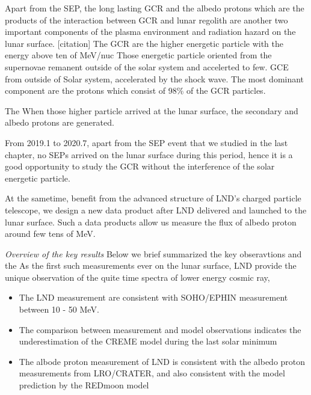 Apart from the \acs{SEP}, the long lasting \ac{GCR} and the albedo protons which are the products of the interaction between \ac{GCR} and lunar regolith are another two important components of the plasma environment and radiation hazard on the lunar surface. [citation]
The \ac{GCR} are the higher energetic particle with the energy above ten of MeV/nuc
Those energetic particle oriented from the supernovae remanent outside of the solar system and accelerted to few. GCE from outside of Solar system, accelerated by the shock wave.
The most dominant component are the protons which consist of 98\% of the GCR particles.

The When those higher particle arrived at the lunar surface, the secondary and albedo protons are generated.



From 2019.1 to 2020.7, apart from the SEP event that we studied in the last chapter, no SEPs arrived on the lunar surface during this period, hence it is a good opportunity to study the \acs{GCR} without the interference of the solar energetic particle.

At the sametime, benefit from the advanced structure of \ac{LND}'s charged particle telescope, we design a new data product after LND delivered and launched to the lunar surface. Such a data products allow us measure the flux of albedo proton around few tens of MeV.

\textit{Overview of the key results}
Below we brief summarized the key obseravtions and the 
As the first such measurements ever on the lunar surface, LND provide the unique observation of the quite time spectra of lower energy cosmic ray, 

\begin{itemize}
    \item The LND measurement are consistent with SOHO/EPHIN measurement between 10 - 50 MeV. 
    \item The comparison between measurement and model observations indicates the underestimation of the CREME model during the last solar minimum
    \item The albode proton measurement of LND is consistent with the albedo proton measurements from LRO/CRATER, and also consistent with the model prediction by the REDmoon model
\end{itemize}




